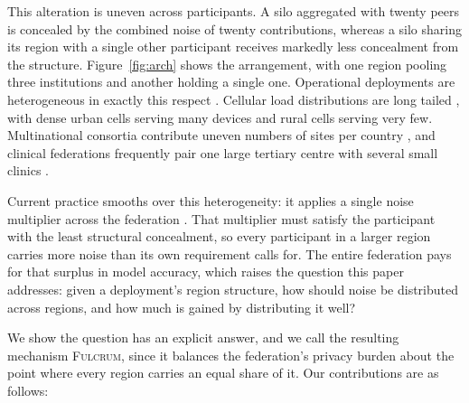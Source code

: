\documentclass[acmsmall,screen,review,anonymous]{acmart}
\theoremstyle{acmdefinition}%
\newcommand{\Fulcrum}{\textsc{Fulcrum}\xspace}
\begin{document}
This alteration is uneven across participants. A silo aggregated with twenty peers
is concealed by the combined noise of twenty contributions, whereas a silo sharing
its region with a single other participant receives markedly less concealment from
the structure. Figure~\ref{fig:arch} shows the arrangement, with one region pooling
three institutions and another holding a single one. Operational deployments are
heterogeneous in exactly this respect \cite{kairouz2021advances}.
Cellular load distributions are long tailed \cite{wang2017cellular}, with dense urban
cells serving many devices and rural cells serving very few. Multinational consortia
contribute uneven numbers of sites per country \cite{heyndrickx2023melloddy}, and
clinical federations frequently pair one large tertiary centre with several small
clinics \cite{terrail2022flamby}.

Current practice smooths over this heterogeneity: it applies a single noise multiplier
across the federation \cite{mcmahan2018dprnn,wei2020nbafl}. That
multiplier must satisfy the participant with the least structural concealment, so
every participant in a larger region carries more noise than its own requirement
calls for. The entire federation pays for that surplus in model accuracy, which
raises the question this paper addresses: given a deployment's region structure,
how should noise be distributed across regions, and how much is gained by
distributing it well?

We show the question has an explicit answer, and we call the resulting mechanism
\Fulcrum, since it balances the federation's privacy burden about the point where
every region carries an equal share of it. Our contributions are as follows:
\end{document}
